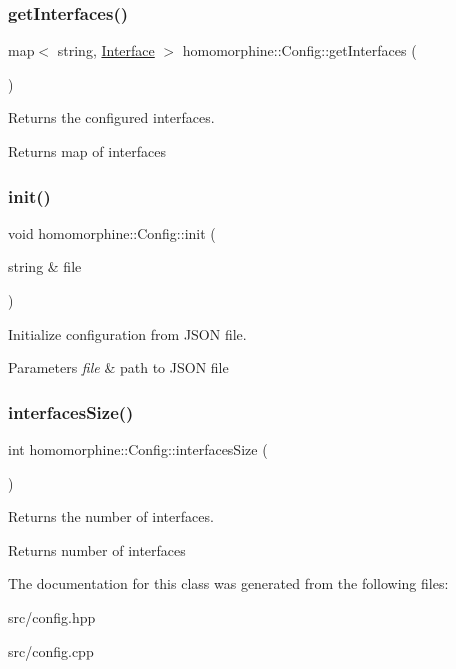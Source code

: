 \subsubsection{\texorpdfstring{get\+Interfaces()}{getInterfaces()}}
{\footnotesize\ttfamily map$<$ string, \hyperlink{classhomomorphine_1_1_interface}{Interface} $>$ homomorphine\+::\+Config\+::get\+Interfaces (\begin{DoxyParamCaption}{ }\end{DoxyParamCaption})}

Returns the configured interfaces.

\begin{DoxyReturn}{Returns}
map of interfaces 
\end{DoxyReturn}
\mbox{\label{classhomomorphine_1_1_config_ae3df94f615e3bc738525626875715a92}} 
\subsubsection{\texorpdfstring{init()}{init()}}
{\footnotesize\ttfamily void homomorphine\+::\+Config\+::init (\begin{DoxyParamCaption}\item[{string \&}]{file }\end{DoxyParamCaption})}

Initialize configuration from J\+S\+ON file.


\begin{DoxyParams}{Parameters}
{\em file} & path to J\+S\+ON file \\
\hline
\end{DoxyParams}
\mbox{\label{classhomomorphine_1_1_config_a48768be288a3e95be68488c02ce19601}} 
\subsubsection{\texorpdfstring{interfaces\+Size()}{interfacesSize()}}
{\footnotesize\ttfamily int homomorphine\+::\+Config\+::interfaces\+Size (\begin{DoxyParamCaption}{ }\end{DoxyParamCaption})}

Returns the number of interfaces.

\begin{DoxyReturn}{Returns}
number of interfaces 
\end{DoxyReturn}


The documentation for this class was generated from the following files\+:\begin{DoxyCompactItemize}
\item 
src/config.\+hpp\item 
src/config.\+cpp\end{DoxyCompactItemize}

